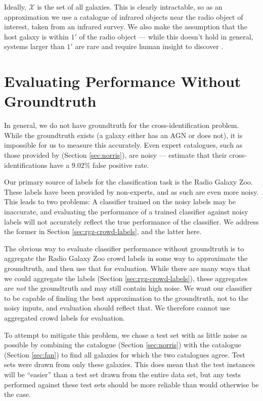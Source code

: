   Ideally, $\mathcal X$ is the set of all galaxies. This is clearly
  intractable, so as an approximation we use a catalogue of infrared objects
  near the radio object of interest, taken from an infrared survey. We also
  make the assumption that the host galaxy is within $1'$ of the radio object
  --- while this doesn't hold in general, systems larger than $1'$ are rare and
  require human insight to discover \citep{banfield16}.

\section{Evaluating Performance Without Groundtruth}
  \label{sec:norris-as-groundtruth}

  In general, we do not have groundtruth for the cross-identification problem.
  While the groundtruth exists (a galaxy either has an AGN or does not), it is
  impossible for us to measure this accurately. Even expert catalogues, such as
  those provided by \citeauthor{norris06} (Section \ref{sec:norris}), are noisy
  --- \citep{norris06} estimate that their cross-identifications have a $9.02\%$
  false positive rate.
  
  Our primary source of labels for the classification task is the Radio Galaxy
  Zoo. These labels have been provided by non-experts, and as such are even more
  noisy. This leads to two problems: A classifier trained on the noisy labels
  may be inaccurate, and evaluating the performance of a trained classifier
  against noisy labels will not accurately reflect the true performance of the
  classifier. We address the former in Section \ref{sec:rgz-crowd-labels}, and
  the latter here.

  The obvious way to evaluate classifier performance without groundtruth is to
  aggregate the Radio Galaxy Zoo crowd labels in some way to approximate the
  groundtruth, and then use that for evaluation. While there are many ways that
  we could aggregate the labels (Section \ref{sec:rgz-crowd-labels}), these
  aggregates are \emph{not} the groundtruth and may still contain high noise. We
  want our classifier to be capable of finding the best approximation to the
  groundtruth, not to the noisy inputs, and evaluation should reflect that. We
  therefore cannot use aggregated crowd labels for evaluation.

  To attempt to mitigate this problem, we chose a test set with as little noise
  as possible by combining the \citeauthor{norris06} catalogue (Section
  \ref{sec:norris}) with the \citeauthor{fan15} catalogue (Section
  \ref{sec:fan}) to find all galaxies for which the two catalogues agree.
  Test sets were drawn from only these galaxies. This does mean that the test
  instances will be ``easier'' than a test set drawn from the entire data set,
  but any tests performed against these test sets should be more reliable than
  would otherwise be the case.

